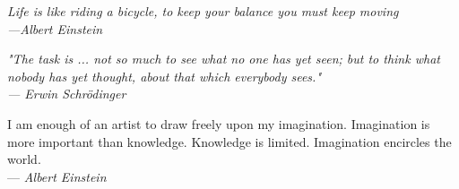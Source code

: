 \thispagestyle{empty}
\mbox{}
\begin{flushright}

{\selectfont
  \vspace{6cm}
  \it{
    Life is like riding a bicycle,
    to keep your balance you must keep moving
  }
  \\
 ---\textit{Albert Einstein}

  \vspace{2cm}
  \it{
    "The task is ... not so much to see what no one has yet seen; but to think what nobody has yet thought, about that which everybody sees."
  }
  \\
  --- \textit{Erwin Schrödinger}
    
  \vspace{2cm}

  I am enough of an artist to draw freely upon my imagination. Imagination is more important than knowledge. Knowledge is limited. Imagination encircles the world.
  \\
  --- \textit{Albert Einstein}
}
\end{flushright}
